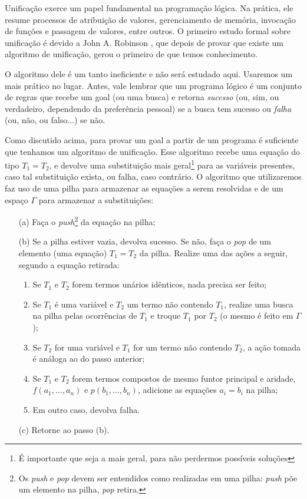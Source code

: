 \documentclass{article}
\theoremstyle{remark}
\theoremstyle{theorem}
\begin{document}
Unificação exerce um papel fundamental na programação lógica. Na prática, ele resume processos de atribuição de valores, gerenciamento de memória, invocação de funções e passagem de valores, entre outros. O primeiro estudo formal sobre unificação é devido a John A. Robinson \cite{robinson}, que depois de provar que existe um algoritmo de unificação, gerou o primeiro de que temos conhecimento. %

O algoritmo dele é um tanto ineficiente e não será estudado aqui. Usaremos um mais prático no lugar. Antes, vale lembrar que um programa lógico é um conjunto de regras que recebe um goal (ou uma busca) e retorna {\it sucesso} (ou, sim, ou verdadeiro, dependendo da preferência pessoal) se a busca tem sucesso ou {\it falha} (ou, não, ou falso...) se não.

Como discutido acima, para provar um goal a partir de um programa é suficiente que tenhamos um algoritmo de unificação. Esse algoritmo recebe uma equação do tipo $T_1 = T_2$, e devolve uma substituição mais geral\footnote{É importante que seja a mais geral, para não perdermos possíveis soluções}
para as variáveis presentes, caso tal substituição exista, ou falha, caso contrário. O algoritmo que utilizaremos faz uso de uma pilha para armazenar as equações a serem resolvidas e de um espaço
$\Gamma$ para armazenar a substituições:

\begin{itemize}
    \item[(a)] Faça o \textit{push}\footnote{Os \textit{push} e \textit{pop} devem ser entendidos como realizadas em uma pilha: \textit{push} põe um elemento na pilha, \textit{pop} retira.} da equação na pilha;
    \item[(b)] Se a pilha estiver vazia, devolva sucesso. Se não, faça o \textit{pop} de um elemento (uma equação) $T_1 = T_2$ da pilha. Realize uma das ações a seguir, segundo a equação retirada:
      \begin{enumerate}
        \item Se $T_1$ e $T_2$ forem termos unários idênticos, nada precisa ser feito;
        \item Se $T_1$ é uma variável e $T_2$ um termo não contendo $T_1$, realize uma busca na pilha pelas ocorrências de $T_1$ e troque $T_1$ por $T_2$ (o mesmo é feito em $\Gamma$); %
        \item Se $T_2$ for uma variável e $T_1$ for um termo não contendo $T_2$, a ação tomada é análoga ao do passo anterior; %
        \item Se $T_1$ e $T_2$ forem termos compostos de mesmo funtor principal e aridade, $f(a_1, ..., a_n)$ e $p(b_1, ..., b_n)$, adicione as equações $a_i = b_i$ na pilha;
        \item Em outro caso, devolva falha.
      \end{enumerate}
    \item[(c)] Retorne ao passo (b).
\end{itemize}
\end{document}
